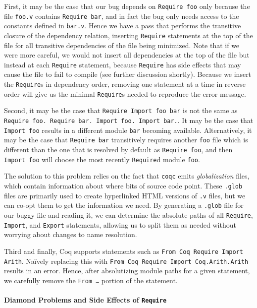 \documentclass[a4paper,USenglish,cleveref,autoref,thm-restate]{lipics-v2021}
\begin{document}
First, it may be the case that our bug depends on \verb|Require foo| only because the file \verb|foo.v| contains \verb|Require bar|, and in fact the bug only needs access to the constants defined in \verb|bar.v|.
Hence we have a pass that performs the transitive closure of the dependency relation, inserting \verb|Require| statements at the top of the file for all transitive dependencies of the file being minimized.
Note that if we were more careful, we would not insert all dependencies at the top of the file but instead at each \verb|Require| statement, because \verb|Require| has side effects that may cause the file to fail to compile (see further discussion shortly).
Because we insert the \verb|Require|s in dependency order, removing one statement at a time in reverse order will give us the minimal \verb|Require|s needed to reproduce the error message.

Second, it may be the case that \verb|Require Import foo bar| is not the same as \texttt{Require foo. Require bar. Import foo. Import bar.}.
It may be the case that \verb|Import foo| results in a different module \verb|bar| becoming available.
Alternatively, it may be the case that \verb|Require bar| transitively requires another \verb|foo| file which is different than the one that is resolved by default as \verb|Require foo|, and then \verb|Import foo| will choose the most recently \verb|Require|d module \verb|foo|.

The solution to this problem relies on the fact that \verb|coqc| emits \emph{globalization} files, which contain information about where bits of source code point.
These \verb|.glob| files are primarily used to create hyperlinked HTML versions of \verb|.v| files, but we can co-opt them to get the information we need.
By generating a \verb|.glob| file for our buggy file and reading it, we can determine the absolute paths of all \verb|Require|, \verb|Import|, and \verb|Export| statements, allowing us to split them as needed without worrying about changes to name resolution.

Third and finally, Coq supports statements such as \verb|From Coq Require Import Arith|.
Na\"ively replacing this with \verb|From Coq Require Import Coq.Arith.Arith| results in an error.
Hence, after absolutizing module paths for a given statement, we carefully remove the \texttt{From \ldots} portion of the statement.


\paragraph{Diamond Problems and Side Effects of \texttt{Require}}
\end{document}
